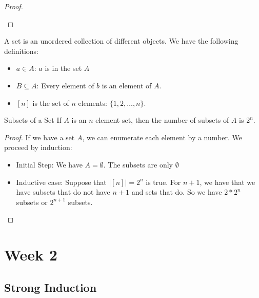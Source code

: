 \documentclass{report}
\begin{document}
\begin{examples}
\begin{example}
\begin{proof}
\begin{itemize}
                    \end{itemize}
            \end{proof}
    \end{example}
    \begin{example}
        A set is an unordered collection of different objects. We have the following definitions:
            \begin{itemize}
                \item $a \in A$: $a$ is in the set $A$

                \item $B \subseteq A$: Every element of $b$ is an element of $A$. 

                \item $[n]$ is the set of $n$ elements: $\{1, 2, \ldots, n\}$.
            \end{itemize}
    \end{example}
\end{examples}

\begin{theorem}{Subsets of a Set}
    If $A$ is an $n$ element set, then the number of subsets of $A$ is $2^{n}$.
\end{theorem}
    \begin{proof}
        If we have a set $A$, we can enumerate each element by a number. We proceed by induction:
            \begin{itemize}
                \item Initial Step: We have $A = \emptyset$. The subsets are only $\emptyset$

                \item Inductive case: Suppose that $\lvert [n] \rvert = 2^{n}$ is true. For $n + 1$, we have that we have subsets that do not have $n + 1$ and sets that do. So we have $2 * 2^{n}$ subsets or $2^{n + 1}$ subsets.
            \end{itemize}
    \end{proof}

\chapter{Week 2}

\begin{topic}
    \section{Strong Induction}
\end{topic}
\end{document}
